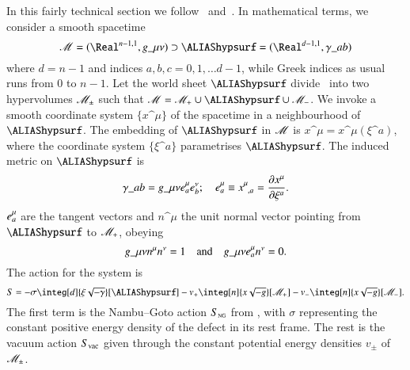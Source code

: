In this fairly technical section we follow~\citet{garrigaPerturbationsDomainWalls1991} and~\citet{ishibashiEquationMotionDomain1999}. %
In mathematical terms, we consider a smooth spacetime
\begin{equation}
    \Manifold = (\Real^{n-1,1}, g\_{\mu\nu}) \supset \hypsurf=(\Real^{d-1,1}, \gamma\_{ab})
\end{equation}
where $d = n-1$ and indices $a,b,c =0,1,\dots d-1$, while Greek indices as usual runs from 0 to $n-1$. Let the world sheet $\hypsurf$ divide \Manifold~into two hypervolumes $\mathscr{M}_{\pm}$ such that $\mathscr{M} = \mathscr{M}_+ \cup  \hypsurf \cup \mathscr{M}_-$. 
We invoke a smooth coordinate system $\{x\^\mu\}$ of the spacetime in a neighbourhood of $\hypsurf$. The embedding of $\hypsurf$ in $\mathscr{M}$ is $x\^\mu = x\^\mu(\xi\^a)$, where the coordinate system $\{\xi\^a\}$ parametrises $\hypsurf$. 
The induced metric on $\hypsurf$ is
\begin{equation}\label{eq:pertwalls:thinwall:induced_metric}
    \gamma\_{ab} = g\_{\mu\nu} e\indices*{^\mu_{a}} e\indices*{^\nu_{b}}; \quad e\indices*{^\mu_{a}}\equiv x\indices{^\mu_{,a}}= \pdv{x\^\mu}{\xi\^a}.%
\end{equation}
%
$e\indices*{^\mu_a}$ are the tangent vectors and $n\^\mu$ the unit normal vector pointing from $\hypsurf$ to $\mathscr{M}_+$, obeying
\begin{equation}
    g\_{\mu\nu} n\^\mu n\^\nu = 1  \quad \text{and}\quad  g\_{\mu\nu} e\indices*{^\mu_a} n\^\nu = 0.
\end{equation}
The action for the system is~\citep{ishibashiEquationMotionDomain1999}
\begin{equation}\label{eq:pertwalls:eom_wall:total_action}
    S = - \sigma \integ[d]{\xi\sqrt{-\gamma}}[\hypsurf] %
    - v_+ \integ[n]{x\sqrt{-g}}[\mathscr{M}_+] %
    - v_- \integ[n]{x\sqrt{-g}}[\mathscr{M}_-]. %
\end{equation}
The first term is the Nambu--Goto action $S_{\text{\tiny{NG}}}$ from , with $\sigma$ representing the constant positive energy density of the defect in its rest frame. The rest is the vacuum action $S_\mathrm{vac}$ given through the constant potential energy densities $v_\pm$ of $\mathscr{M}_\pm$. %

